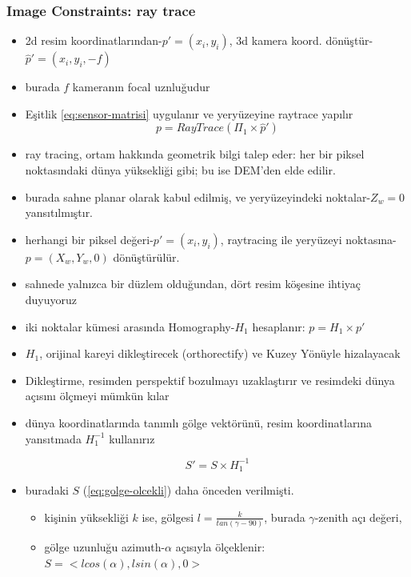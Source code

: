 \documentclass{beamer}
\begin{document}
\begin{frame}[allowframebreaks]
	\frametitle{Image Constraints: ray trace}

	\begin{itemize}
		\item 2d resim koordinatlarından-$p'=(x_i, y_i)$, 3d kamera koord.
			dönüştür- $\hat{p}'=(x_i, y_i, -f)$
		\item burada $f$ kameranın focal uznluğudur
		\item Eşitlik \ref{eq:sensor-matrisi} uygulanır ve yeryüzeyine raytrace
			yapılır
			\begin{equation}
				p = RayTrace(\Pi_1 \times \hat{p}')
				\label{eq:ray-trace}
			\end{equation}
		\item ray tracing, ortam hakkında geometrik bilgi talep eder: her bir
			piksel noktasındaki dünya yüksekliği gibi; bu ise DEM'den elde
			edilir.
		\item burada sahne planar olarak kabul edilmiş, ve yeryüzeyindeki
			noktalar-$Z_w=0$ yansıtılmıştır.
		\item herhangi bir piksel değeri-$p'=(x_i, y_i)$, raytracing ile
			yeryüzeyi noktasına-$p=(X_w,Y_w,0)$ dönüştürülür.
		\item sahnede yalnızca bir düzlem olduğundan, dört resim köşesine
			ihtiyaç duyuyoruz
		\item iki noktalar kümesi arasında Homography-$H_1$ hesaplanır:
			$p = H_1 \times p'$
		\item $H_1$, orijinal kareyi dikleştirecek (orthorectify) ve Kuzey
			Yönüyle hizalayacak
		\item Dikleştirme, resimden perspektif bozulmayı uzaklaştırır ve
			resimdeki dünya açısını ölçmeyi mümkün kılar
		\item dünya koordinatlarında tanımlı gölge vektörünü, resim
			koordinatlarına yansıtmada $H_1^{-1}$ kullanırız

			\begin{equation}
				S' = S \times H_1^{-1}
				\label{eq:diklestirme}
			\end{equation}
		\item buradaki $S$ (\ref{eq:golge-olcekli}) daha önceden verilmişti.

		\begin{itemize}
			\item kişinin yüksekliği $k$ ise, gölgesi
				$l = \frac{k}{tan(\gamma - 90)}$, burada $\gamma$-zenith açı değeri,
			\item gölge uzunluğu azimuth-$\alpha$ açısıyla ölçeklenir:
				$S = <l	cos(\alpha), l sin(\alpha), 0>$
		\end{itemize}
	\end{itemize}
\end{frame}
\end{document}
